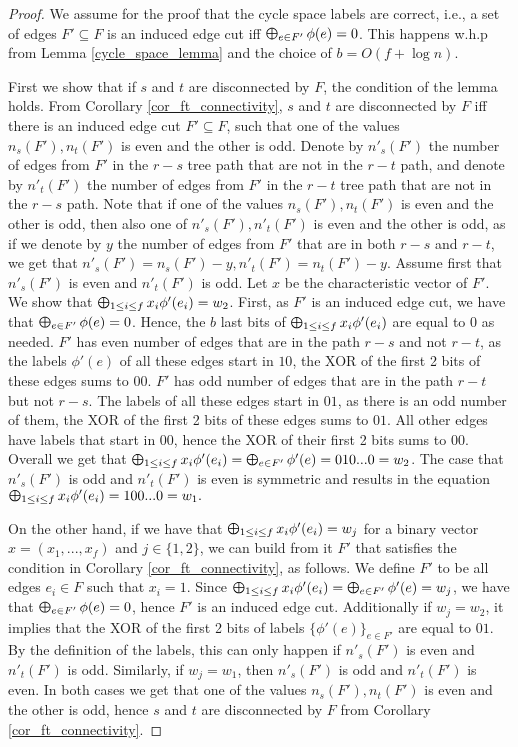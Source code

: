 \begin{proof}
We assume for the proof that the cycle space labels are correct, i.e., a set of edges $F' \subseteq F$ is an induced edge cut iff $\Moplus_{e \in F'} \phi(e) = 0$. This happens w.h.p from Lemma \ref{cycle_space_lemma} and the choice of $b=O(f + \log{n})$.

First we show that if $s$ and $t$ are disconnected by $F$, the condition of the lemma holds.
From Corollary \ref{cor_ft_connectivity}, $s$ and $t$ are disconnected by $F$ iff there is an induced edge cut $F' \subseteq F$, such that one of the values $n_s(F'),n_t(F')$ is even and the other is odd. Denote by $n'_s(F')$ the number of edges from $F'$ in the $r-s$ tree path that are not in the $r-t$ path, and denote by $n'_t(F')$ the number of edges from $F'$ in the $r-t$ tree path that are not in the $r-s$ path. Note that if one of the values $n_s(F'),n_t(F')$ is even and the other is odd, then also one of $n'_s(F'),n'_t(F')$ is even and the other is odd, as if we denote by $y$ the number of edges from $F'$ that are in both $r-s$ and $r-t$, we get that $n'_s(F') = n_s(F') - y, n'_t(F') = n_t(F') - y$. Assume first that $n'_s(F')$ is even and $n'_t(F')$ is odd. Let $x$ be the characteristic vector of $F'$. We show that $\Moplus_{1 \leq i \leq f} x_i \phi'(e_i)  = w_2$. First, as $F'$ is an induced edge cut, we have that $\Moplus_{e \in F'} \phi(e) = 0$. Hence, the $b$ last bits of $\Moplus_{1 \leq i \leq f} x_i \phi'(e_i)$ are equal to 0 as needed. $F'$ has even number of edges that are in the path $r-s$ and not $r-t$, as the labels $\phi'(e)$ of all these edges start in $10$, the XOR of the first 2 bits of these edges sums to $00$.  $F'$ has odd number of edges that are in the path $r-t$ but not $r-s$. The labels of all these edges start in $01$, as there is an odd number of them, the XOR of the first 2 bits of these edges sums to $01$. All other edges have labels that start in $00$, hence the XOR of their first 2 bits sums to $00$. Overall we get that $\Moplus_{1 \leq i \leq f} x_i \phi'(e_i)=\Moplus_{e \in F'} \phi'(e)=010...0=w_2$. The case that $n'_s(F')$ is odd and $n'_t(F')$ is even is symmetric and results in the equation $\Moplus_{1 \leq i \leq f} x_i \phi'(e_i)=100...0=w_1.$

On the other hand, if we have that $\Moplus_{1 \leq i \leq f} x_i \phi'(e_i)=w_j$ for a binary vector $x=(x_1,...,x_f)$ and $j \in \{1,2\}$, we can build from it $F'$ that satisfies the condition in Corollary \ref{cor_ft_connectivity}, as follows. We define $F'$ to be all edges $e_i \in F$ such that $x_i =1$. Since $\Moplus_{1 \leq i \leq f} x_i \phi'(e_i)=\Moplus_{e \in F'} \phi'(e)=w_j$, we have that $\Moplus_{e \in F'} \phi(e) = 0$, hence $F'$ is an induced edge cut. Additionally if $w_j=w_2$, it implies that the XOR of the first 2 bits of labels $\{\phi'(e)\}_{e \in F'}$ are equal to $01$. By the definition of the labels, this can only happen if $n'_s(F')$ is even and $n'_t(F')$ is odd. Similarly, if $w_j=w_1$, then $n'_s(F')$ is odd and $n'_t(F')$ is even. In both cases we get that one of the values $n_s(F'),n_t(F')$ is even and the other is odd, hence $s$ and $t$ are disconnected by $F$ from Corollary \ref{cor_ft_connectivity}. 
\end{proof}

